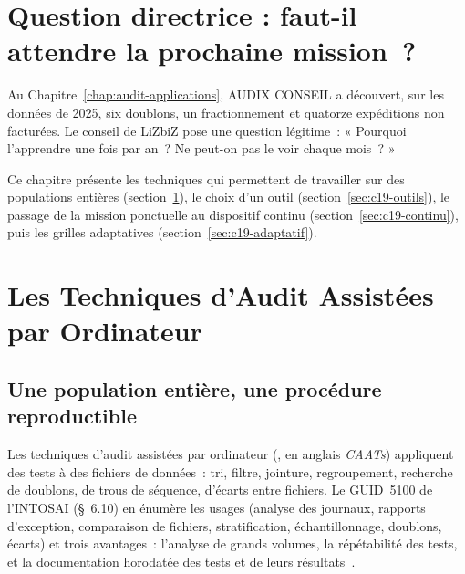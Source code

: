 \bigskip

\section*{Question directrice : faut-il attendre la prochaine mission~?}

Au Chapitre~\ref{chap:audit-applications}, AUDIX CONSEIL a découvert, sur
les données de 2025, six doublons, un fractionnement et quatorze
expéditions non facturées. Le conseil de LiZbiZ pose une question
légitime~: « Pourquoi l'apprendre une fois par an~? Ne peut-on pas le voir
chaque mois~? »

Ce chapitre présente les techniques qui permettent de travailler sur des
populations entières (section~\ref{sec:c19-taao}), le choix d'un outil
(section~\ref{sec:c19-outils}), le passage de la mission ponctuelle au
dispositif continu (section~\ref{sec:c19-continu}), puis les grilles
adaptatives (section~\ref{sec:c19-adaptatif}).

\separateur

\section{Les Techniques d'Audit Assistées par Ordinateur}
\label{sec:c19-taao}

\subsection{Une population entière, une procédure reproductible}

Les techniques d'audit assistées par ordinateur (, en anglais
\textit{CAATs}) appliquent des tests à des fichiers de données~: tri,
filtre, jointure, regroupement, recherche de doublons, de trous de
séquence, d'écarts entre fichiers. Le GUID~5100 de l'INTOSAI (§~6.10) en
énumère les usages (analyse des journaux, rapports d'exception,
comparaison de fichiers, stratification, échantillonnage, doublons,
écarts) et trois avantages~: l'analyse de grands volumes, la répétabilité
des tests, et la documentation horodatée des tests et de leurs
résultats~\cite{intosai2019guid5100}.

